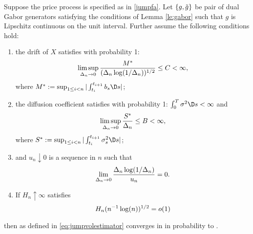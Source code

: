 \begin{prop}\label{pro:finite}
  Suppose the  price process is specified as in \eqref{jumpfa}. Let $\{g, \tilde{g}\}$ be pair of dual Gabor generators satisfying the conditions of Lemma \eqref{le:gabor} such that $g$ is Lipschitz continuous on the unit interval. Further assume the following conditions hold:
  \begin{enumerate}[label=\emph{(}\roman*\emph{)}]
    \item 
  the drift of $X$ satisfies with probability 1:
  \begin{align}
    \limsup_{\Delta_n \to 0} \frac{M^*}{(\Delta_n \log(1/\Delta_n))^{1/2}} \le  C< \infty, \notag
    \label{}
  \end{align}
where $M^* : = \sup_{1 \le i <n} \vert \int^{t_{i+1}}_{t_i} b_s \D s\vert$;
\item the diffusion coefficient satisfies with probability 1:  $\int^T_0 \sigma^2 \D s < \infty$ and 
  \begin{align}
\limsup_{\Delta_n \to 0} \frac{S^*}{\Delta_n} \le B <\infty, \notag
    \label{}
  \end{align}
  where $S^* := \sup_{1 \le i <n} \vert \int^{t_{i+1}}_{t_i} \sigma^2_s \D s\vert$;
\item and   $u_n \downarrow 0 $ is a sequence in $n$ such that  
\begin{align}
    \lim_{\Delta_n \to 0} \frac{\Delta_n \log (1/\Delta_n)}{u_n} = 0.\notag
    \label{}
  \end{align}
\item If $H_n \uparrow \infty$ satisfies 
  \begin{align}
    H_n (n^{-1} \log(n))^{1/2} = o(1)\notag
    \label{}
  \end{align}
  \end{enumerate}
  then
  \jvn as defined in \eqref{eq:jumpvolestimator}  converges in \Ltwo in probability to \sv.
\end{prop}
